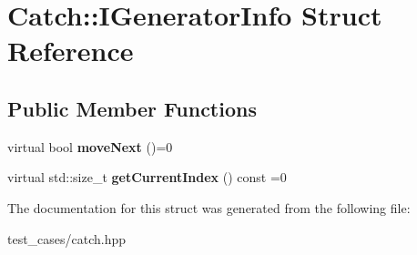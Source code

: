 \hypertarget{structCatch_1_1IGeneratorInfo}{}\section{Catch\+:\+:I\+Generator\+Info Struct Reference}
\label{structCatch_1_1IGeneratorInfo}
\subsection*{Public Member Functions}
\begin{DoxyCompactItemize}
\item 
\mbox{\label{structCatch_1_1IGeneratorInfo_a2b86711ca7009903edfe27ed62b515ef}} 
virtual bool {\bfseries move\+Next} ()=0
\item 
\mbox{\label{structCatch_1_1IGeneratorInfo_a6a0dca712d31f6849fd9447b1344673a}} 
virtual std\+::size\+\_\+t {\bfseries get\+Current\+Index} () const =0
\end{DoxyCompactItemize}


The documentation for this struct was generated from the following file\+:\begin{DoxyCompactItemize}
\item 
test\+\_\+cases/catch.\+hpp\end{DoxyCompactItemize}
